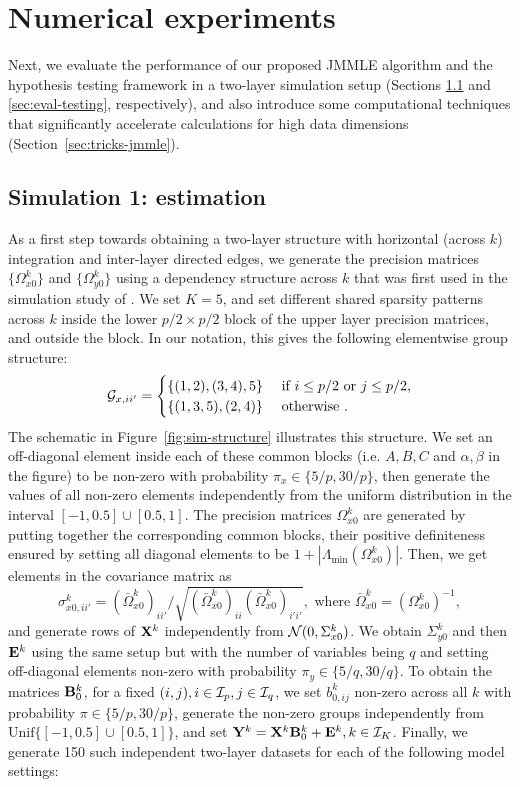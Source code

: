 \section{Numerical experiments}
\label{sec:sec4}
Next, we evaluate the performance of our proposed JMMLE algorithm and the hypothesis testing framework in a two-layer simulation setup (Sections \ref{sec:eval-jmmle} and \ref{sec:eval-testing}, respectively), and also introduce some computational techniques that significantly accelerate calculations for high data dimensions (Section~\ref{sec:tricks-jmmle}).

\subsection{Simulation 1: estimation}
\label{sec:eval-jmmle}
As a first step towards obtaining a two-layer structure with horizontal (across $k$) integration and inter-layer directed edges, we generate the precision matrices $\{ \Omega_{x0}^k \}$ and $\{ \Omega_{y0}^k \}$ using a dependency structure across $k$ that was first used in the simulation study of \citet{MaMichailidis15}. We set $K=5$, and set different shared sparsity patterns across $k$ inside the lower $p/2 \times p/2$ block of the upper layer precision matrices, and outside the block. In our notation, this gives the following elementwise group structure:
%
$$
{\cal{G}}_{x,ii'} = \begin{cases}
\{ (1,2),(3,4), 5 \} &\text{ if } i \leq p/2 \text{ or } j \leq p/2,\\
\{ (1,3,5),(2,4) \} &\text{ otherwise }.
\end{cases}
$$
%
The schematic in Figure~\ref{fig:sim-structure} illustrates this structure. We set an off-diagonal element inside each of these common blocks (i.e. $A,B,C$ and $\alpha, \beta$ in the figure) to be non-zero with probability $\pi_x \in \{ 5/p, 30/p \}$, then generate the values of all non-zero elements independently from the uniform distribution in the interval $[-1, 0.5] \cup [0.5, 1]$. The precision matrices $\Omega_{x0}^k$ are generated by putting together the corresponding common blocks, their positive definiteness ensured by setting all diagonal elements to be $1 + |\Lambda_{\min} (\Omega_{x0}^k)|$. Then, we get elements in the covariance matrix as
%
$$
\sigma_{x0,ii'}^k = (\bar \Omega_{x0}^k)_{ii'} / \sqrt{(\bar \Omega_{x0}^k)_{ii} (\bar \Omega_{x0}^k)_{i'i'} },
\text{ where } \bar \Omega_{x0}^k = (\Omega_{x0}^k)^{-1},
$$
and generate rows of ${\mathbf{X}}^k$ independently from ${\cal{N}}(0, \Sigma_{x0}^k)$. We obtain $\Sigma_{y0}^k$ and then ${\mathbf{E}}^k$ using the same setup but with the number of variables being $q$ and setting off-diagonal elements non-zero with probability $\pi_y \in \{ 5/q, 30/q \}$. To obtain the matrices ${\mathbf{B}}_0^k$, for a fixed $(i,j), i \in {\cal{I}}_p, j \in {\cal{I}}_q$, we set $b_{0,ij}^k$ non-zero across all $k$ with probability $\pi \in \{ 5/p, 30/p \}$, generate the non-zero groups independently from $\text{Unif} \{ [-1, 0.5] \cup [0.5, 1] \}$, and set ${\mathbf{Y}}^k = {\mathbf{X}}^k {\mathbf{B}}_0^k + {\mathbf{E}}^k, k \in {\cal{I}}_K$. Finally, we generate 150 such independent two-layer datasets for each of the following model settings:

